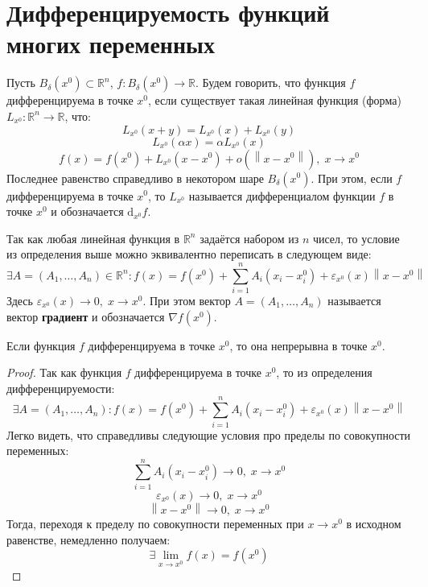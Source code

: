 \documentclass[11pt]{article}
\begin{document}
\section{Дифференцируемость функций многих переменных}

\begin{definition}
    Пусть $B_{\delta}\left(x^0\right) \subset \mathbb{R}^n$, $f \colon B_{\delta}\left(x^0\right) \to \mathbb{R}$. 
    Будем говорить, что функция $f$ дифференцируема в точке $x^0$, если существует такая линейная функция (форма)
    $L_{x^0} \colon \mathbb{R}^n \to \mathbb{R}$, что:
    \[L_{x^0}(x + y) = L_{x^0}(x) + L_{x^0}(y)\] 
    \[L_{x^0}(\alpha x) = \alpha L_{x^0} (x)\]
    \[f(x) = f\left(x^0\right) + L_{x^0}\left(x - x^0\right) + o\left(\left\lVert x - x^0 \right\rVert\right), \; x \to x^0\]
    Последнее равенство справедливо в некотором шаре $B_{\delta}\left(x^0\right)$. При этом, если 
     $f$ дифференцируема в точке $x^0$, то $L_{x^0}$ называется дифференциалом функции $f$ в точке $x^0$ и обозначается 
    $\mathrm{d}_{x^0}f$.
\end{definition}

\begin{remark}
    Так как любая линейная функция в $\mathbb{R}^n$ задаётся набором из $n$ чисел, то условие из определения выше 
    можно эквивалентно переписать в следующем виде:
    \[\exists A = \left(A_1, \ldots, A_n\right) \in \mathbb{R}^n: f(x) = f\left(x^0\right) + \sum_{i = 1}^n A_i \left(x_i - x_i^0\right) + \varepsilon_{x^0}(x) \left\lVert x - x^0 \right\rVert \]
    Здесь $\varepsilon_{x^0}(x) \to 0, \; x \to x^0$. При этом вектор $A = \left(A_1, \ldots, A_n\right)$ называется вектор \textbf{градиент} и обозначается $\nabla f\left(x^0\right)$.
\end{remark}

\begin{lemma}
    Если функция $f$ дифференцируема в точке $x^0$, то она непрерывна в точке $x^0$.
\end{lemma}

\begin{proof}
    Так как функция $f$ дифференцируема в точке $x^0$, то из определения дифференцируемости:
    \[\exists A = \left(A_1, \ldots, A_n \right): f(x) = f\left(x^0\right) + \sum_{i = 1}^n A_i \left(x_i - x_i^0\right) + \varepsilon_{x^0}(x) \left\lVert x - x^0 \right\rVert\]
    Легко видеть, что справедливы следующие условия про пределы по совокупности переменных:
    \[\sum_{i = 1}^n A_i \left(x_i - x_i^0\right) \to 0, \; x \to x^0\]
    \[\varepsilon_{x^0}(x) \to 0, \; x \to x^0\]
    \[\left\lVert x - x^0 \right\rVert \to 0, \; x \to x^0\]
    Тогда, переходя к пределу по совокупности переменных при $x \to x^0$ в исходном равенстве, немедленно получаем:
    \[\exists \lim_{x \to x^0} f(x) = f\left(x^0\right)\]
\end{proof}
\end{document}
